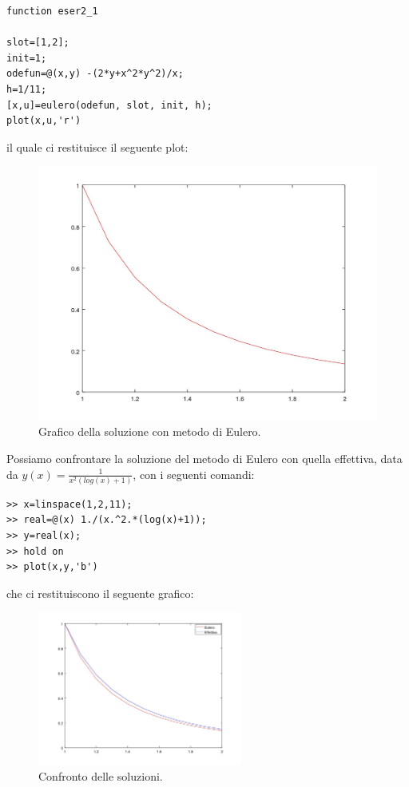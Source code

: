 \documentclass[11pt,a4paper,twoside,openright,titlepage,
headinclude,footinclude,BCOR5mm,
numbers=noenddot,cleardoublepage=empty,
tablecaptionabove]{scrbook}
\begin{document}
\begin{lstlisting}[frame=trBL]
function eser2_1

slot=[1,2];
init=1;
odefun=@(x,y) -(2*y+x^2*y^2)/x;
h=1/11;
[x,u]=eulero(odefun, slot, init, h);
plot(x,u,'r')
\end{lstlisting}
il quale ci restituisce il seguente plot:

\begin{center}
\begin{figure}[h!]
\includegraphics[width=\textwidth]{figs/metodo_eulero.jpg}
\caption{Grafico della soluzione con metodo di Eulero.}
\end{figure}
\end{center}

Possiamo confrontare la soluzione del metodo di Eulero con quella effettiva, data da $y(x)=\frac{1}{x^2(log(x)+1)}$,
con i seguenti comandi:

\begin{lstlisting}[frame=lines]
>> x=linspace(1,2,11);
>> real=@(x) 1./(x.^2.*(log(x)+1));
>> y=real(x);
>> hold on
>> plot(x,y,'b')
\end{lstlisting}
che ci restituiscono il seguente grafico:
\begin{center}
\begin{figure}[h!]
\includegraphics[width=0.60\textwidth]{figs/confronto_metodo_eulero.jpg}
\caption{Confronto delle soluzioni.}
\end{figure}
\end{center}
\end{document}
